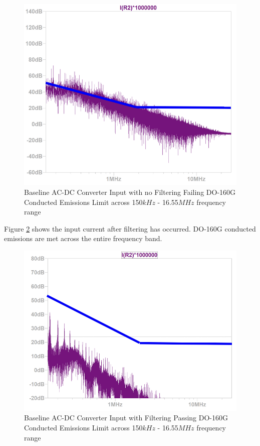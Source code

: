 \documentclass[conference]{IEEEtran}
\begin{document}
\begin{figure}[h]
    \centering
    \includegraphics[width=1.0\linewidth]{no_input_filter_emissions_limit.png}
    \caption{Baseline AC-DC Converter Input with no Filtering Failing DO-160G Conducted Emissions Limit across 150$kHz$ - 16.55$MHz$ frequency range}
    \label{fig:no_input_filter_top_level_waveform}
\end{figure}

Figure \ref{fig:input_filter_emissions_limit_waveform} shows the input current after filtering has occurred. DO-160G conducted emissions are met across the entire frequency band.

\begin{figure}[h]
    \centering
    \includegraphics[width=1.0\linewidth]{input_filter_emissions_limit.png}
    \caption{Baseline AC-DC Converter Input with Filtering Passing DO-160G Conducted Emissions Limit across 150$kHz$ - 16.55$MHz$ frequency range}
    \label{fig:input_filter_emissions_limit_waveform}
\end{figure}
\end{document}
